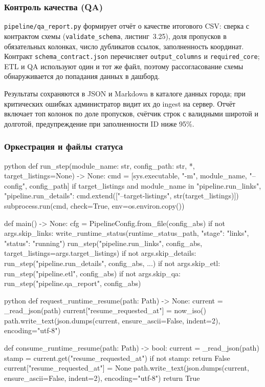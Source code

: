 \subsubsection{Контроль качества (QA)}

\texttt{pipeline/qa\_report.py} формирует отчёт о качестве итогового CSV: сверка с контрактом схемы (\texttt{validate\_schema}, листинг~3.25), доля пропусков в обязательных колонках, число дубликатов ссылок, заполненность координат. Контракт \texttt{schema\_contract.json} перечисляет \texttt{output\_columns} и \texttt{required\_core}; ETL и QA используют один и тот же файл, поэтому рассогласование схемы обнаруживается до попадания данных в дашборд.

Результаты сохраняются в JSON и Markdown в каталоге данных города; при критических ошибках администратор видит их до ingest на сервер. Отчёт включает топ колонок по доле пропусков, счётчик строк с валидными широтой и долготой, предупреждение при заполненности ID ниже 95\%.

\subsubsection{Оркестрация и файлы статуса}

\begin{singleminted}{python}
def run_step(module_name: str, config_path: str, *, target_listings=None) -> None:
    cmd = [sys.executable, "-m", module_name, "--config", config_path]
    if target_listings and module_name in {"pipeline.run_links", "pipeline.run_details"}:
        cmd.extend(["--target-listings", str(target_listings)])
    subprocess.run(cmd, check=True, env=os.environ.copy())

def main() -> None:
    cfg = PipelineConfig.from_file(config_abs)
    if not args.skip_links:
        write_runtime_status(runtime_status_path, {"stage": "links", "status": "running"})
        run_step("pipeline.run_links", config_abs, target_listings=args.target_listings)
    if not args.skip_details:
        run_step("pipeline.run_details", config_abs, ...)
    if not args.skip_etl:
        run_step("pipeline.etl", config_abs)
    if not args.skip_qa:
        run_step("pipeline.qa_report", config_abs)
\end{singleminted}
\label{lst:run-pipeline}

\begin{singleminted}{python}
def request_runtime_resume(path: Path) -> None:
    current = _read_json(path)
    current["resume_requested_at"] = now_iso()
    path.write_text(json.dumps(current, ensure_ascii=False, indent=2), encoding="utf-8")

def consume_runtime_resume(path: Path) -> bool:
    current = _read_json(path)
    stamp = current.get("resume_requested_at")
    if not stamp:
        return False
    current["resume_requested_at"] = None
    path.write_text(json.dumps(current, ensure_ascii=False, indent=2), encoding="utf-8")
    return True
\end{singleminted}
\label{lst:runtime-resume}

